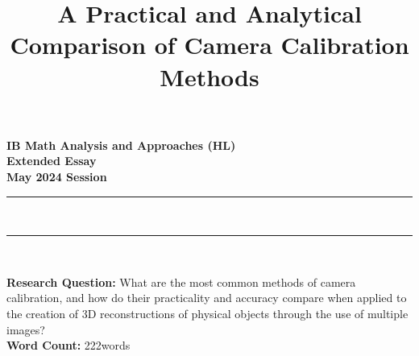 \documentclass[letter, 12pt, oneside]{article}
\title{A Practical and Analytical Comparison of Camera Calibration Methods}
\providecommand{\wordcount}{222}
\begin{document}
\pagestyle{normal}

\begin{titlepage}
    \large
    
    \begin{center}

        \vspace*{2cm}
        
        {\bfseries 
        IB Math Analysis and Approaches (HL) \\
        Extended Essay\\
        May 2024 Session}\\ 

        \vspace*{\fill}
    
        \rule{\linewidth}{1.5pt} \\ [0.5cm]
        {\LARGE \bfseries \thetitle}
        \rule{\linewidth}{0.5pt} \\
        
        \vspace*{\fill}
    
        \textbf{Research Question:} What are the most common methods of camera calibration,  and how do their practicality and accuracy compare when applied to the creation of 3D reconstructions of physical objects through the use of multiple images? \\ [1cm]

        \textbf{Word Count:} \wordcount \space words

        \vspace*{2cm}
    
    \end{center}
    
\end{titlepage}

\thispagestyle{empty}
\tableofcontents

\clearpage
{}
\setcounter{page}{1}






\clearpage
\printbibliography[heading=bibintoc]{}
\end{document}
